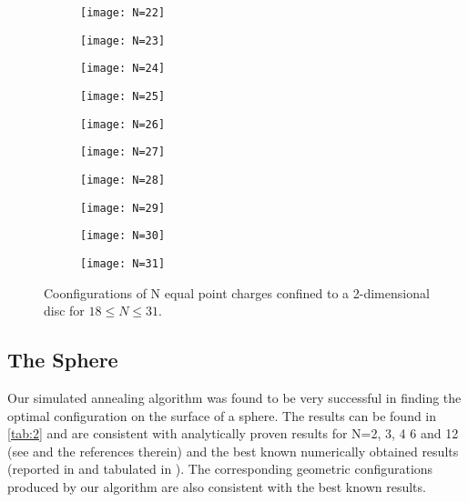 \documentclass[12pt,a4paper,final]{iopart}
\begin{document}
{\begin{figure}\label{fig:disc2}
\centering
  \begin{subfigure}[b]{0.24\textwidth}
    \texttt{[image: N=22]}
    \label{fig:1}
  \end{subfigure}
  \begin{subfigure}[b]{0.24\textwidth}
    \texttt{[image: N=23]}
    \label{fig:2}
  \end{subfigure}
  \begin{subfigure}[b]{0.24\textwidth}
    \texttt{[image: N=24]}
    \label{fig:1}
  \end{subfigure}
  \begin{subfigure}[b]{0.24\textwidth}
    \texttt{[image: N=25]}
    \label{fig:2}
  \end{subfigure}
  \begin{subfigure}[b]{0.24\textwidth}
    \texttt{[image: N=26]}
    \label{fig:2}
  \end{subfigure}
  \begin{subfigure}[b]{0.24\textwidth}
    \texttt{[image: N=27]}
    \label{fig:2}
  \end{subfigure}
  \begin{subfigure}[b]{0.24\textwidth}
    \texttt{[image: N=28]}
    \label{fig:2}
  \end{subfigure}
  \begin{subfigure}[b]{0.24\textwidth}
    \texttt{[image: N=29]}
    \label{fig:2}
  \end{subfigure}
  \begin{subfigure}[b]{0.24\textwidth}
    \texttt{[image: N=30]}
    \label{fig:2}
  \end{subfigure}
  \begin{subfigure}[b]{0.24\textwidth}
    \texttt{[image: N=31]}
    \label{fig:2}
  \end{subfigure}
  \caption{Coonfigurations of N equal point charges confined to a 2-dimensional disc for $18 \leq N \leq 31$.}
\end{figure}

\subsection{The Sphere}

Our simulated annealing algorithm was found to be very successful in finding the optimal configuration on the surface of a sphere. The results can be found in \ref{tab:2} and are consistent with analytically proven results for N=2, 3, 4 6 and 12 (see \cite{ana1, ana2, ana3, ana4, ana5} and the references therein) and the best known numerically obtained results (reported in \cite{spheretable} and tabulated in \cite{swarm}). The corresponding geometric configurations produced by our algorithm are also consistent with the best known results. 
 
}
\end{document}
